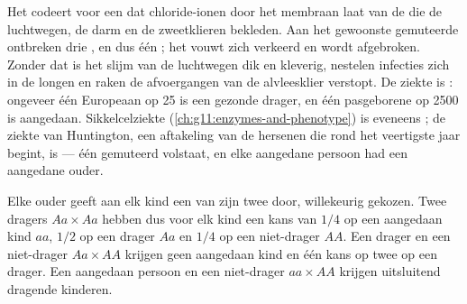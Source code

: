 \begin{example}[Taaislijmziekte]\label{ex:g11:genes-and-disease:cf}
Het  codeert voor een  dat chloride-ionen door het membraan
laat van de  die de luchtwegen, de darm en de zweetklieren
bekleden. Aan het gewoonste gemuteerde  ontbreken drie ,
en dus één ; het  vouwt zich verkeerd en wordt afgebroken.
Zonder dat  is het slijm van de luchtwegen dik en kleverig, nestelen
infecties zich in de longen en raken de afvoergangen van de alvleesklier
verstopt. De ziekte is : ongeveer één Europeaan op 25 is een
gezonde drager, en één pasgeborene op 2500 is aangedaan. Sikkelcelziekte
(\cref{ch:g11:enzymes-and-phenotype}) is eveneens ; de ziekte
van Huntington, een aftakeling van de hersenen die rond het veertigste
jaar begint, is  --- één gemuteerd  volstaat, en elke
aangedane persoon had een aangedane ouder.
\end{example}

\begin{proposition}\label{prop:g11:genes-and-disease:recessive}
Elke ouder geeft aan elk kind een van zijn twee  door, willekeurig
gekozen. Twee dragers $Aa \times Aa$ hebben dus voor elk kind een kans
van $1/4$ op een aangedaan kind $aa$, $1/2$ op een drager $Aa$ en $1/4$
op een niet-drager $AA$. Een drager en een niet-drager $Aa \times AA$
krijgen geen aangedaan kind en één kans op twee op een drager. Een
aangedaan persoon en een niet-drager $aa \times AA$ krijgen uitsluitend
dragende kinderen.
\end{proposition}
\admitted

